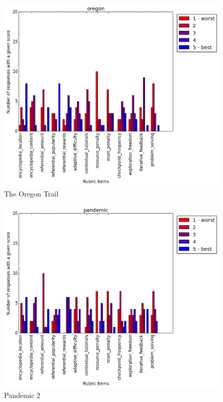 			\begin{figure}[h] 
			\centering 
			\includegraphics[width=\textwidth]{oregon_scores.png} 
			\caption{The Oregon Trail}
			\end{figure}

			\begin{figure}[h] 
			\centering 
			\includegraphics[width=\textwidth]{pandemic_scores.png} 
			\caption{Pandemic 2}
			\end{figure}

